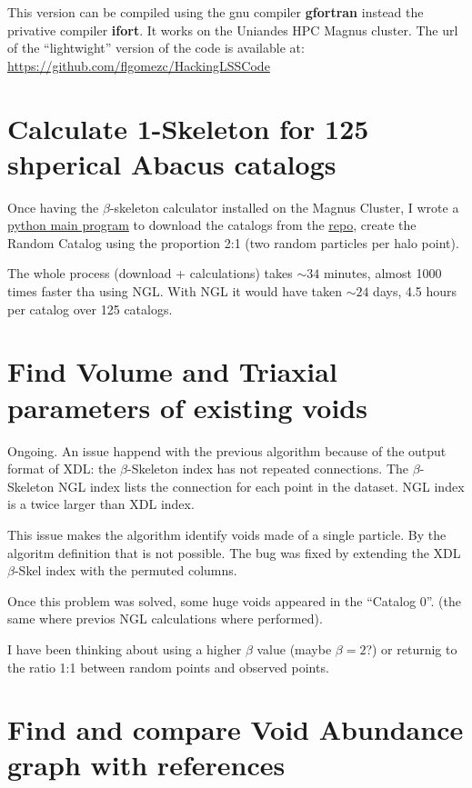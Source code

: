 \documentclass[preprint]{aastex62}
\begin{document}
This version can be compiled using the gnu compiler \textbf{gfortran} instead the privative
compiler \textbf{ifort}. It works on the Uniandes HPC Magnus cluster. The url of the
``lightwight'' version of the code is available at: 
\url{https://github.com/flgomezc/HackingLSSCode}

\section{Calculate 1-Skeleton for 125 shperical Abacus catalogs}

Once having the $\beta$-skeleton calculator installed on the Magnus Cluster, I wrote a
\href{https://github.com/flgomezc/master_thesis/blob/master/15_running_on_cluster/125_spherical_catalogs.py}
{python main program} to download the catalogs from the \href{https://github.com/forero/abacus/}{repo},
create the Random Catalog using the proportion 2:1 (two random particles per halo point).

The whole process (download + calculations) takes $\sim 34$ minutes, almost 1000 times faster
tha using NGL. With NGL it would have taken $\sim 24$ days, 4.5 hours per catalog over 125 catalogs.

\section{Find Volume and Triaxial parameters of existing voids}

Ongoing. An issue happend with the previous algorithm because of the output format of XDL:
the $\beta$-Skeleton index has not repeated connections. The $\beta$-Skeleton NGL index lists
the connection for each point in the dataset. NGL index is a twice larger than XDL index. 

This issue makes the algorithm identify voids made of a single particle. By the algoritm definition
that is not possible. The bug was fixed by extending the XDL $\beta$-Skel index with the permuted
columns.

Once this problem was solved, some huge voids appeared in the ``Catalog 0''. (the same where
previos NGL calculations where performed).

I have been thinking about using a higher $\beta$ value (maybe $\beta=2$?) or returnig to the
ratio 1:1 between random points and observed points.

\section{Find and compare Void Abundance graph with references}
\end{document}
